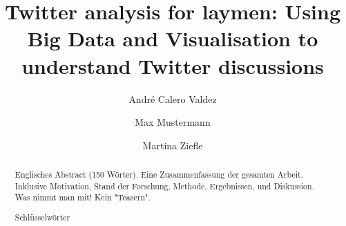 \documentclass[runningheads,a4paper]{llncs}
\newcommand{\keywords}[1]{\par\addvspace\baselineskip
\noindent\keywordname\enspace\ignorespaces#1}
\begin{document}
\mainmatter  %

\title{Twitter analysis for laymen: Using Big Data and Visualisation to understand Twitter discussions}



\author{Andr\'{e} Calero Valdez \and Max Mustermann \and Martina Ziefle}
%

%
%


\maketitle


\begin{abstract}

Englisches Abstract (150 Wörter). Eine Zusammenfassung der gesamten Arbeit. 
Inklusive Motivation, Stand der Forschung, Methode, Ergebnissen, und Diskussion.
Was nimmt man mit! Kein "Teasern".


\keywords{5 Schlüsselwörter}
\end{abstract}






\makeatletter
\renewcommand\@biblabel[1]{#1. }
\makeatother

\end{document}
